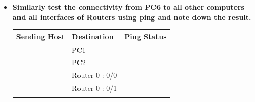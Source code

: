 \documentclass[a4paper,11pt]{article}
\begin{document}
\begin{enumerate}
\begin{itemize}
              \item \textbf{Similarly test the connectivity from PC6 to all other computers and all interfaces of Routers
                        using ping and note down the result.}



                    \begin{table}[H]
                        \centering
                        \begin{tabular}{| m{10em}| m{10em}| m{10em} |}
                            \hline
                            \multicolumn{1}{|l|}{\textbf{Sending Host}}                     & \textbf{Destination} & \multicolumn{1}{l|}{\textbf{Ping Status}}                                  \\
                            \hline
                            {\cellcolor[rgb]{0.141,0.525,1}}                                & PC1                  & {\cellcolor[rgb]{0.42,0.988,0.827}}                                        \\
                            \hhline{|>{\arrayrulecolor[rgb]{0.141,0.525,1}}->{\arrayrulecolor{black}}->{\arrayrulecolor[rgb]{0.42,0.988,0.827}}->{\arrayrulecolor{black}}|}
                            {\cellcolor[rgb]{0.141,0.525,1}}                                & PC2                  & {\cellcolor[rgb]{0.42,0.988,0.827}}                                        \\
                            \hhline{|>{\arrayrulecolor[rgb]{0.141,0.525,1}}->{\arrayrulecolor{black}}->{\arrayrulecolor[rgb]{0.42,0.988,0.827}}->{\arrayrulecolor{black}}|}
                            {\cellcolor[rgb]{0.141,0.525,1}}                                & Router 0 : 0/0       & {\cellcolor[rgb]{0.42,0.988,0.827}}                                        \\
                            \hhline{|>{\arrayrulecolor[rgb]{0.141,0.525,1}}->{\arrayrulecolor{black}}->{\arrayrulecolor[rgb]{0.42,0.988,0.827}}->{\arrayrulecolor{black}}|}
                            {\cellcolor[rgb]{0.141,0.525,1}}                                & Router 0 : 0/1       & {\cellcolor[rgb]{0.42,0.988,0.827}}                                        \\
                            \hhline{|>{\arrayrulecolor[rgb]{0.141,0.525,1}}->{\arrayrulecolor{black}}->{\arrayrulecolor[rgb]{0.42,0.988,0.827}}->{\arrayrulecolor{black}}|}

\end{tabular}
\end{table}
\end{itemize}
\end{enumerate}
\end{document}
